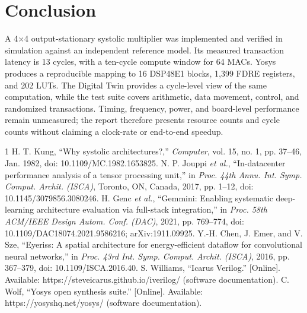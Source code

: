 \documentclass[conference]{IEEEtran}
\begin{document}
\section{Conclusion}
A 4$\times$4 output-stationary systolic multiplier was implemented and verified in simulation against an independent
reference model. Its measured transaction latency is 13 cycles, with a ten-cycle compute window for 64 MACs. Yosys
produces a reproducible mapping to 16 DSP48E1 blocks, 1,399 FDRE registers, and 202 LUTs. The Digital Twin provides a
cycle-level view of the same computation, while the test suite covers arithmetic, data movement, control, and randomized
transactions. Timing, frequency, power, and board-level performance remain unmeasured; the report therefore presents
resource counts and cycle counts without claiming a clock-rate or end-to-end speedup.

\begin{thebibliography}{1}
 H. T. Kung, ``Why systolic architectures?,'' \emph{Computer}, vol. 15, no. 1, pp. 37--46, Jan. 1982, doi: 10.1109/MC.1982.1653825.
 N. P. Jouppi \emph{et al.}, ``In-datacenter performance analysis of a tensor processing unit,'' in \emph{Proc. 44th Annu. Int. Symp. Comput. Archit. (ISCA)}, Toronto, ON, Canada, 2017, pp. 1--12, doi: 10.1145/3079856.3080246.
 H. Genc \emph{et al.}, ``Gemmini: Enabling systematic deep-learning architecture evaluation via full-stack integration,'' in \emph{Proc. 58th ACM/IEEE Design Autom. Conf. (DAC)}, 2021, pp. 769--774, doi: 10.1109/DAC18074.2021.9586216; arXiv:1911.09925.
 Y.-H. Chen, J. Emer, and V. Sze, ``Eyeriss: A spatial architecture for energy-efficient dataflow for convolutional neural networks,'' in \emph{Proc. 43rd Int. Symp. Comput. Archit. (ISCA)}, 2016, pp. 367--379, doi: 10.1109/ISCA.2016.40.
 S. Williams, ``Icarus Verilog.'' [Online]. Available: https://steveicarus.github.io/iverilog/ (software documentation).
 C. Wolf, ``Yosys open synthesis suite.'' [Online]. Available: https://yosyshq.net/yosys/ (software documentation).
\end{thebibliography}
\end{document}
